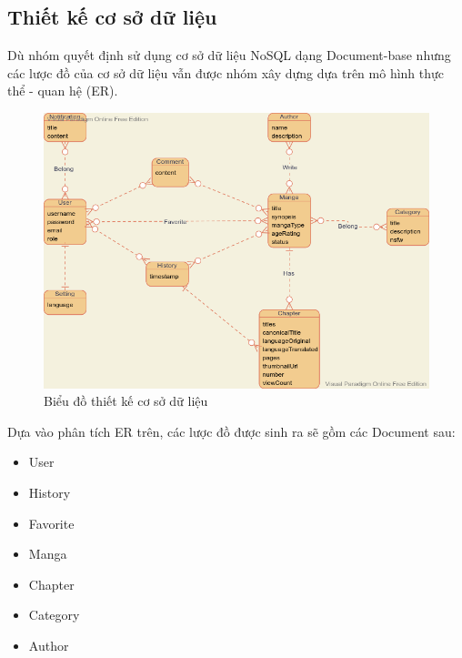 \documentclass[./../main.tex]{subfiles}
\begin{document}
\subsection{Thiết kế cơ sở dữ liệu}
Dù nhóm quyết định sử dụng cơ sở dữ liệu NoSQL dạng Document-base nhưng các lược đồ của cơ sở dữ liệu vẫn được nhóm xây dựng dựa trên mô hình thực thể - quan hệ (ER).
\begin{figure}[H]
	\centering
	\includegraphics[width=\linewidth]{./images/image8.png}
	\caption{Biểu đồ thiết kế cơ sở dữ liệu}
\end{figure}
Dựa vào phân tích ER trên, các lược đồ được sinh ra sẽ gồm các Document sau:
\begin{itemize}
	\item User
	\item History
	\item Favorite
	\item Manga
	\item Chapter
	\item Category
	\item Author
\end{itemize}
\end{document}
